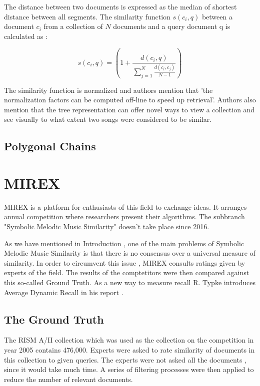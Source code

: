 \documentclass{llncs}
\begin{document}
		The distance between two documents is expressed as the median of shortest distance between all segments. The similarity function $s(c_i , q)$ between a document $c_i$ from a collection of $N$ documents and a query document q is calculated as :
		
		\begin{equation}
			s(c_i , q)= (1 + \frac{d(c_i , q)}{\sum_{j=1}^{N} \frac{d(c_i,c_j)}{N-1}}) 
		\end{equation}

		The similarity function is normalized and authors mention that 'the normalization factors can be computed off-line to speed up retrieval'. Authors also mention that the tree representation can offer novel ways to view a collection and see visually to what extent two songs were considered to be similar.

		\subsection{Polygonal Chains}

		\subsection{}


		
	\section{MIREX}
		MIREX is a platform for enthusiasts of this field to exchange ideas. It arranges annual competition where researchers present their algorithms. The subbranch "Symbolic Melodic Music Similarity" doesn't take place since 2016. 


		As we have mentioned in Introduction , one of the main problems of Symbolic Melodic Music Similarity is that there is no consensus over a universal measure of similarity. In order to circumvent this issue , MIREX consults ratings given by experts of the field. The results of the comptetitors were then compared against this so-called Ground Truth. As a new way to measure recall R. Typke introduces Average Dynamic Recall in his report \cite{three}.       


		\subsection{The Ground Truth}
 		The RISM A/II collection which was used as the collection on the competition in year 2005 contains 476,000. Experts were asked to rate similarity of documents in this collection to given queries. The experts were not asked all the documents , since it would take much time. A series of filtering processes were then applied to reduce the number of relevant documents. 
\end{document}

